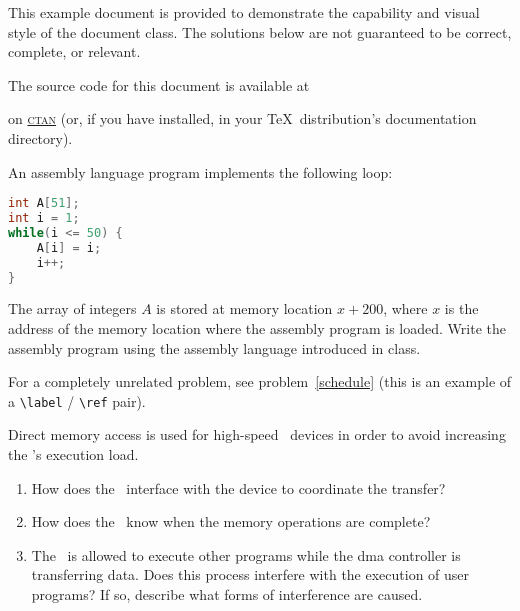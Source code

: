 \documentclass[
	gantt,
	scheme,
	assembly,
	math,
	pseudocode,
	tabu
]{brandeis-problemset}
\begin{document}
\maketitle

 This example document is provided to demonstrate the capability
and visual style of the
\href{https://ctan.org/pkg/brandeis-problemset}{}
document class. The solutions below are not guaranteed to be correct,
complete, or relevant.

The source code for this document is available at
\begin{quote}
	\href{http://mirrors.ctan.org/macros/latex/contrib/brandeis-problemset/example.tex}{}
\end{quote}
on \href{https://ctan.org/}{\textsc{ctan}} (or, if you have
 installed, in your \TeX\ distribution's
documentation directory).

\tableofcontents

\begin{problem}[part=Textbook problems]
	An assembly language program implements the following loop:

\begin{lstlisting}[language=c]
int A[51];
int i = 1;
while(i <= 50) {
	A[i] = i;
	i++;
}
\end{lstlisting}

	The array of integers $A$ is stored at memory location $x + 200$,
	where $x$ is the address of the memory location where the assembly
	program is loaded. Write the assembly program using the assembly
	language introduced in class.

	For a completely unrelated problem, see problem~\ref{schedule} (this
	is an example of a \lstinline!\label! / \lstinline!\ref! pair).
\end{problem}


\begin{problem}[number=1.11]
	Direct memory access is used for high-speed \io\ devices in order to
	avoid increasing the \cpu's execution load.

	\begin{enumerate}
		\item How does the \cpu\ interface with the device to
			coordinate the transfer?
		\item How does the \cpu\ know when the memory operations are
			complete?
		\item The \cpu\ is allowed to execute other programs while
			the \ac{dma} controller is transferring data. Does
			this process interfere with the execution of user
			programs? If so, describe what forms of interference
			are caused.
	\end{enumerate}
\end{problem}
\end{document}
